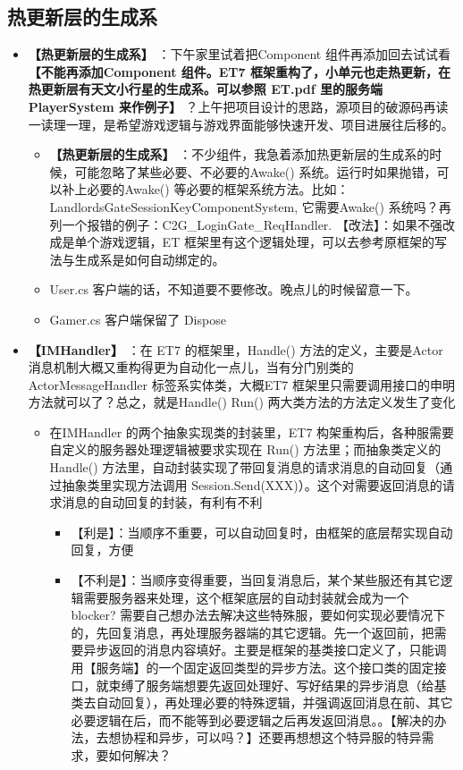 \documentclass[9pt, b5paper]{article}
\begin{document}
\subsection{热更新层的生成系}
\label{sec-8-1}
\begin{itemize}
\item \textbf{【热更新层的生成系】} ：下午家里试着把Component 组件再添加回去试试看 \textbf{【不能再添加Component 组件。ET7 框架重构了，小单元也走热更新，在热更新层有天文小行星的生成系。可以参照 ET.pdf 里的服务端 PlayerSystem 来作例子】} ？上午把项目设计的思路，源项目的破源码再读一读理一理，是希望游戏逻辑与游戏界面能够快速开发、项目进展往后移的。
\begin{itemize}
\item \textbf{【热更新层的生成系】} ：不少组件，我急着添加热更新层的生成系的时候，可能忽略了某些必要、不必要的Awake() 系统。运行时如果抛错，可以补上必要的Awake() 等必要的框架系统方法。比如：LandlordsGateSessionKeyComponentSystem, 它需要Awake() 系统吗？再列一个报错的例子：C2G\_LoginGate\_ReqHandler. 【改法】：如果不强改成是单个游戏逻辑，ET 框架里有这个逻辑处理，可以去参考原框架的写法与生成系是如何自动绑定的。
\item User.cs 客户端的话，不知道要不要修改。晚点儿的时候留意一下。
\item Gamer.cs 客户端保留了 Dispose
\end{itemize}
\item \textbf{【IMHandler】} ：在 ET7 的框架里，Handle() 方法的定义，主要是Actor 消息机制大概又重构得更为自动化一点儿，当有分门别类的ActorMessageHandler 标签系实体类，大概ET7 框架里只需要调用接口的申明方法就可以了？总之，就是Handle() Run() 两大类方法的方法定义发生了变化
\begin{itemize}
\item 在IMHandler 的两个抽象实现类的封装里，ET7 构架重构后，各种服需要自定义的服务器处理逻辑被要求实现在 Run() 方法里；而抽象类定义的Handle() 方法里，自动封装实现了带回复消息的请求消息的自动回复（通过抽象类里实现方法调用 Session.Send(XXX)）。这个对需要返回消息的请求消息的自动回复的封装，有利有不利
\begin{itemize}
\item 【利是】：当顺序不重要，可以自动回复时，由框架的底层帮实现自动回复，方便
\item 【不利是】：当顺序变得重要，当回复消息后，某个某些服还有其它逻辑需要服务器来处理，这个框架底层的自动封装就会成为一个 blocker? 需要自己想办法去解决这些特殊服，要如何实现必要情况下的，先回复消息，再处理服务器端的其它逻辑。先一个返回前，把需要异步返回的消息内容填好。主要是框架的基类接口定义了，只能调用【服务端】的一个固定返回类型的异步方法。这个接口类的固定接口，就束缚了服务端想要先返回处理好、写好结果的异步消息（给基类去自动回复），再处理必要的特殊逻辑，并强调返回消息在前、其它必要逻辑在后，而不能等到必要逻辑之后再发返回消息。。【解决的办法，去想协程和异步，可以吗？】还要再想想这个特异服的特异需求，要如何解决？

\end{itemize}
\end{itemize}
\end{itemize}
\end{document}
